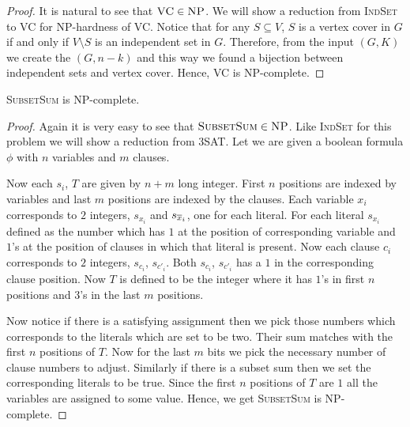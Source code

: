\begin{proof}
It is natural to see that $\textsc{VC}\in\textsc{NP}$. We will show a reduction from \textsc{IndSet} to \textsc{VC} for \textsc{NP}-hardness of \textsc{VC}. Notice that for any $S\subseteq V$, $S$ is a vertex cover in $G$ if and only if $V\setminus S$ is an independent set in $G$. Therefore, from the input $(G,K)$ we create the $(G,n-k)$ and this way we found a bijection between independent sets and vertex cover. Hence, \textsc{VC} is \textsc{NP}-complete.
\end{proof}
\begin{Theorem}{}{}
\textsc{SubsetSum} is \textsc{NP}-complete. 
\end{Theorem}
\begin{proof}
Again it is very easy to see that $\textsc{SubsetSum}\in\textsc{NP}$. Like \textsc{IndSet} for this problem we will show a reduction from \textsc{3SAT}. Let we are given a boolean formula $\phi$ with $n$ variables and $m$ clauses.

Now each $s_i$, $T$ are given by $n+m$ long integer. First $n$ positions are indexed by variables and last $m$ positions are indexed by the clauses. Each variable $x_i$ corresponds to $2$ integers, $s_{x_i}$ and $s_{\overline{x}_i}$, one for each literal. For each literal $s_{x_i}$ defined as the number which has $1$ at the position of corresponding variable and $1$'s at the position of clauses in which that literal is present. Now each clause $c_i$ corresponds to $2$ integers, $s_{c_i}$, $s_{c'_i}$. Both $s_{c_i}$, $s_{c'_i}$ has a $1$ in the corresponding clause position. Now $T$ is defined to be the integer where it has $1$'s in first $n$ positions and $3$'s in the last $m$ positions.

Now notice if there is a satisfying assignment then we pick those numbers which corresponds to the literals which are set to be two. Their sum matches with the first $n$ positions of $T$. Now for the last $m$ bits we pick the necessary number of clause numbers to adjust. Similarly if there is a subset sum then we set the corresponding literals to be true. Since the first $n$ positions of $T$ are $1$ all the variables are assigned to some value. Hence, we get \textsc{SubsetSum} is \textsc{NP}-complete. 
\end{proof}